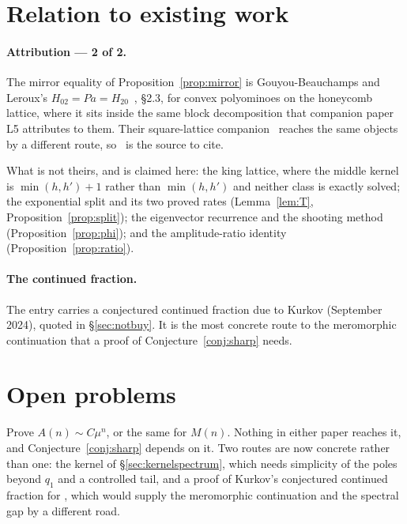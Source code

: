 \documentclass[11pt]{article}
\begin{document}
\section{Relation to existing work}
\label{sec:related}

\paragraph{Attribution --- 2 of 2.} The mirror equality of
Proposition~\ref{prop:mirror} is Gouyou-Beauchamps and Leroux's
$H_{02} = Pa = H_{20}$~\cite{gblRoux2004}, \S2.3, for convex polyominoes on the
honeycomb lattice, where it sits inside the same block decomposition that
companion paper L5 attributes to them. Their square-lattice
companion~\cite{lrr1998} reaches the same objects by a different route,
so~\cite{gblRoux2004} is the source to cite.

What is not theirs, and is claimed here: the king lattice, where the
middle kernel is $\min(h,h')+1$ rather than $\min(h,h')$ and neither class is
exactly solved; the exponential split and its two proved rates
(Lemma~\ref{lem:T}, Proposition~\ref{prop:split}); the eigenvector recurrence
and the shooting method (Proposition~\ref{prop:phi}); and the amplitude-ratio
identity (Proposition~\ref{prop:ratio}).

\paragraph{The continued fraction.} The  entry carries a
conjectured continued fraction due to Kurkov (September 2024), quoted in
\S\ref{sec:notbuy}. It is the most concrete route to the meromorphic
continuation that a proof of Conjecture~\ref{conj:sharp} needs.

\section{Open problems}

\begin{openproblem}
Prove $A(n) \sim C\mu^n$, or the same for $M(n)$. Nothing in either paper
reaches it, and Conjecture~\ref{conj:sharp} depends on it. Two routes are now
concrete rather than one: the kernel of \S\ref{sec:kernelspectrum}, which needs
simplicity of the poles beyond $q_1$ and a controlled tail, and a proof of
Kurkov's conjectured continued fraction for , which would supply
the meromorphic continuation and the spectral gap by a different road.
\end{openproblem}
\end{document}
